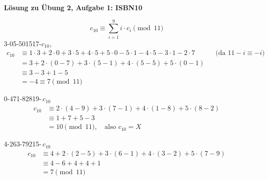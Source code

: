 \textbf{Lösung zu Übung 2, Aufgabe 1: ISBN10}

\begin{loesung}
\[
c_{10} \equiv \sum_{i=1}^{9} i \cdot c_i \pmod{11}
\]
3-05-501517-$c_{10}$,
\begin{align*}
c_{10} &\equiv 1 \cdot 3 + 2 \cdot 0 + 3 \cdot 5 + 4 \cdot 5 + 5 \cdot 0 - 5 \cdot 1 - 4 \cdot 5 - 3 \cdot 1 - 2 \cdot 7 && \text{(da } 11 - i \equiv -i\text{)}\\
&= 3 + 2 \cdot (0-7) + 3 \cdot (5-1) + 4 \cdot (5-5) + 5 \cdot (0-1)\\
&\equiv 3 - 3 + 1 - 5\\
&= -4 \equiv 7 \pmod{11}
\end{align*}

0-471-82819-\,$c_{10}$
\begin{align*}
c_{10} &\equiv 2 \cdot (4-9) + 3 \cdot (7-1) + 4 \cdot (1-8) + 5 \cdot (8-2)\\
&\equiv 1 + 7 + 5 - 3\\
&= 10 \pmod{11}, \quad \text{also } c_{10} = X
\end{align*}

4-263-79215-\,$c_{10}$
\begin{align*}
c_{10} &\equiv 4 + 2 \cdot (2-5) + 3 \cdot (6-1) + 4 \cdot (3-2) + 5 \cdot (7-9)\\
&\equiv 4 - 6 + 4 + 4 + 1\\
&= 7 \pmod{11}
\end{align*}
\end{loesung}
